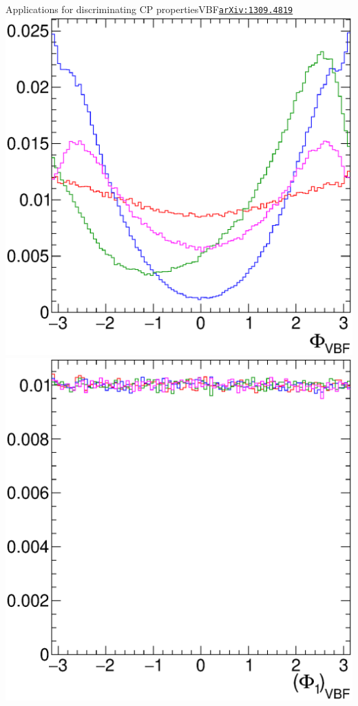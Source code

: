 \documentclass[usenames,dvipsnames,svgnames,table]{beamer}
\newcommand{\arxiv}[1]{\href{http://arxiv.org/abs/#1}{\nolinkurl{arXiv:#1}}}
\newcommand{\snowmass}{\arxiv{1309.4819}}
\begin{document}
\begin{frame}{Applications for discriminating CP properties}{VBF\hfill\snowmass}
\includegraphics[width=.25\textwidth]{myplots/Phi}
\includegraphics[width=.25\textwidth]{myplots/Phi1}
\end{frame}
\end{document}
